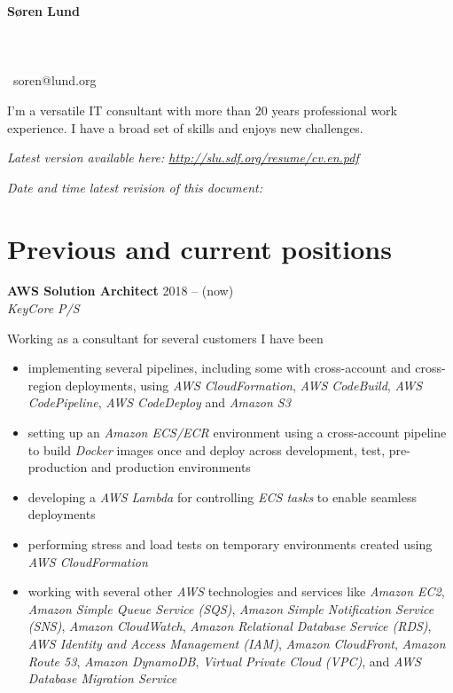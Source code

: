 \documentclass[a4paper,11pt]{article}
\newcommand\redacted{[hidden in online version]}
\newcommand\myaddressone{\redacted}
\newcommand\myaddresstwo{\redacted}
\newcommand\myphone{\redacted}
\begin{document}
\centerline{}
\bigskip

\begin{minipage}[b]{0.30\textwidth}
  \selectfont%
  \textbf{Søren Lund} \\
  \myaddressone \\
  \myaddresstwo \\
  \myphone \\
  \Email\ soren@lund.org
\end{minipage}%
\hfill
\begin{minipage}[b]{0.30\textwidth}
  \selectfont%
  I'm a versatile IT consultant with
  more than 20 years professional 
  work experience. I have a broad
  set of skills and enjoys new
  challenges.
\end{minipage}

\bigskip
\centerline{\small\textit{Latest version available here: \url{http://slu.sdf.org/resume/cv.en.pdf}}}
\centerline{\small\textit{Date and time latest revision of this document: }}

\section*{Previous and current positions}

\textbf{AWS Solution Architect} \hfill 2018 -- (now) \\
\textsl{KeyCore P/S}

Working as a consultant for several customers I have been 

\begin{itemize}
  \item implementing several pipelines, including some with
    cross-account and cross-region deployments, using \textit{AWS
      CloudFormation}, \textit{AWS CodeBuild}, \textit{AWS
      CodePipeline}, \textit{AWS CodeDeploy} and \textit{Amazon S3}
  \item setting up an \textit{Amazon ECS/ECR} environment using a
    cross-account pipeline to build \textit{Docker} images once and
    deploy across development, test, pre-production and production
    environments
  \item developing a \textit{AWS Lambda} for controlling \textit{ECS
    tasks} to enable seamless deployments
  \item performing stress and load tests on temporary environments
    created using \textit{AWS CloudFormation}
  \item working with several other \textit{AWS} technologies and
    services like \textit{Amazon EC2}, \textit{Amazon Simple Queue
      Service (SQS)}, \textit{Amazon Simple Notification Service
      (SNS)}, \textit{Amazon CloudWatch}, \textit{Amazon Relational
      Database Service (RDS)}, \textit{AWS Identity and Access
      Management (IAM)}, \textit{Amazon CloudFront}, \textit{Amazon
      Route 53}, \textit{Amazon DynamoDB}, \textit{Virtual Private
      Cloud (VPC)}, and \textit{AWS Database Migration Service}
\end{itemize}
\end{document}

